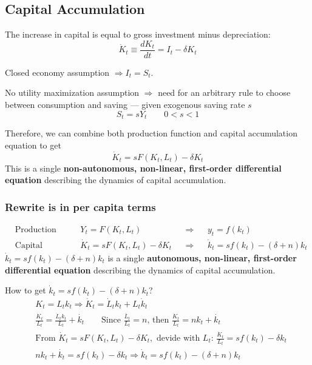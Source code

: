\subsection{Capital Accumulation} The increase in capital is equal to gross investment minus depreciation: \[
    \dot{K}_t \equiv \frac{d K_t}{dt} = I_t - \delta K_t
\]

Closed economy assumption $\Longrightarrow I_t = S_t$.

No utility maximization assumption $\Longrightarrow$ need for an arbitrary rule to choose between consumption and saving --- given exogenous saving rate $s$ \[
    S_t = s Y_t \qquad 0<s<1
\]

Therefore, we can combine both production function and capital accumulation equation to get \[
    \dot{K}_{t} = sF(K_t, L_t) - \delta K_t
\]
This is a single \textbf{non-autonomous, non-linear, first-order differential equation} describing the dynamics of capital accumulation.

\subsubsection{Rewrite is in per capita terms}
\begin{align*}
     & \text{Production Function:}           &  & Y_t = F(K_t, L_t)                       &  & \Longrightarrow &  & y_t=f(k_t)                            \\
     & \text{Capital Accumulation Equation:} &  & \dot{K}_{t} = sF(K_t, L_t) - \delta K_t &  & \Longrightarrow &  & \dot{k}_t = sf(k_t) - (\delta + n)k_t
\end{align*}
\underline{$\dot{k}_t = sf(k_t) - (\delta + n)k_t$} is a single \textbf{autonomous, non-linear, first-order differential equation} describing the dynamics of capital accumulation.

\begin{remark*}
    How to get $\dot{k}_t = sf(k_t) - (\delta + n)k_t$?
    \begin{align*}
         & K_t = L_tk_t                                                                                    \Longrightarrow
        \dot{K}_t = \dot{L}_tk_t + L_t\dot{k}_t                                                                                          \\
         & \frac{\dot{K}_t}{L_t} = \frac{\dot{L}_tk_t}{L_t} + \dot{k_t}
        \qquad\text{Since $\frac{\dot{L_t}}{L_t} = n$, then } \frac{\dot{K}_t}{L_t} = n k_t + \dot{k_t}                                  \\
         & \text{From }\dot{K}_{t} = sF(K_t, L_t) - \delta K_t, \text{ devide with $L_t$: }   \frac{\dot{K}_t}{L_t} = sf(k_t)-\delta k_t \\
         & n k_t + \dot{k_t}  = sf(k_t)-\delta k_t \Longrightarrow \dot{k}_t = sf(k_t) - (\delta + n)k_t
    \end{align*}
\end{remark*}


